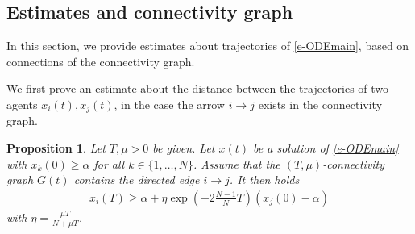 \documentclass[journal]{article}
\newtheorem{proposition}[lemma]{Proposition}
\begin{document}
\subsection{Estimates and connectivity graph}
\label{s-graph}

In this section, we provide estimates about trajectories of \eqref{e-ODEmain}, based on connections of the connectivity graph.

We first prove an estimate about the distance between the trajectories of two agents $x_i(t),x_j(t)$, in the case the arrow $i\to j$ exists in the connectivity graph.
\begin{proposition}\label{p-1step} Let $T,\mu>0$ be given. Let $x(t)$ be a solution of \eqref{e-ODEmain} with $x_k(0)\geq \alpha$ for all $k\in\{1,\ldots,N\}$. Assume that the $(T,\mu)$-connectivity graph $G(t)$ contains the directed edge $i\to j$. It then holds
\begin{eqnarray}
\label{e-1step}
x_i(T)\geq \alpha+\eta\exp(-2\tfrac{N-1}{N}T)(x_j(0)-\alpha)
\end{eqnarray}
with $\eta=\frac{\mu T}{N+\mu T}$.
\end{proposition}
\end{document}
